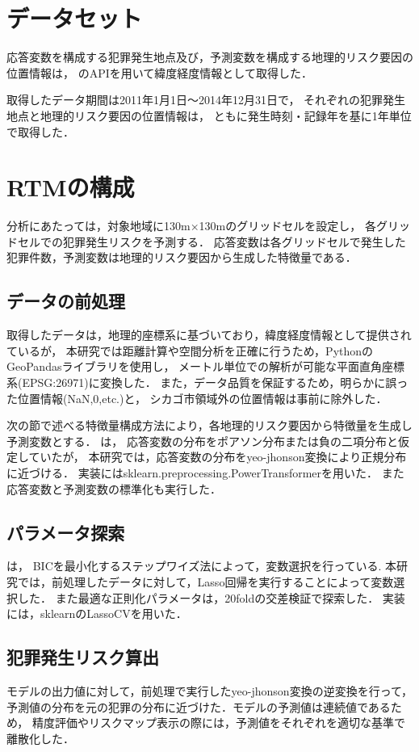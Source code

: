 \documentclass[12pt,a4paper,oneside]{jsbook}
\theoremstyle{plain}
\begin{document}
\section{データセット}
応答変数を構成する犯罪発生地点及び，予測変数を構成する地理的リスク要因の位置情報は，
\citet{ChicagoDataPortal}のAPIを用いて緯度経度情報として取得した．

取得したデータ期間は2011年1月1日〜2014年12月31日で，
それぞれの犯罪発生地点と地理的リスク要因の位置情報は，
ともに発生時刻・記録年を基に1年単位で取得した．
\section{RTMの構成}
分析にあたっては，対象地域に130m×130mのグリッドセルを設定し，
各グリッドセルでの犯罪発生リスクを予測する．
応答変数は各グリッドセルで発生した犯罪件数，予測変数は地理的リスク要因から生成した特徴量である．

\subsection{データの前処理}
取得したデータは，地理的座標系に基づいており，緯度経度情報として提供されているが，
本研究では距離計算や空間分析を正確に行うため，PythonのGeoPandasライブラリを使用し，
メートル単位での解析が可能な平面直角座標系(EPSG:26971)に変換した．
また，データ品質を保証するため，明らかに誤った位置情報(NaN,0,etc.)と，
シカゴ市領域外の位置情報は事前に除外した．

次の節で述べる特徴量構成方法により，各地理的リスク要因から特徴量を生成し予測変数とする．
\citet{caplan2015risk}は，
応答変数の分布をポアソン分布または負の二項分布と仮定していたが，
本研究では，応答変数の分布をyeo-jhonson変換\citep{weisberg2001yeo}により正規分布に近づける．
実装にはsklearn.preprocessing.PowerTransformerを用いた．
また応答変数と予測変数の標準化も実行した．

\subsection{パラメータ探索}
\citet{caplan2015risk}は，
BICを最小化するステップワイズ法によって，変数選択を行っている.
本研究では，前処理したデータに対して，Lasso回帰を実行することによって変数選択した．
また最適な正則化パラメータは，20foldの交差検証で探索した．
実装には，sklearnのLassoCVを用いた．

\subsection{犯罪発生リスク算出}
モデルの出力値に対して，前処理で実行したyeo-jhonson変換の逆変換を行って，
予測値の分布を元の犯罪の分布に近づけた．モデルの予測値は連続値であるため，
精度評価やリスクマップ表示の際には，予測値をそれぞれを適切な基準で離散化した．
\end{document}
